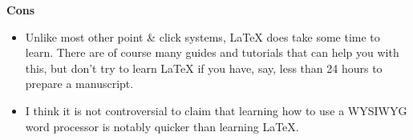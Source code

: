 \documentclass[a4paper,12pt]{article}
\begin{document}
\begin{enumerate}
  \textbf{Cons}
  \begin{itemize}
  \item  Unlike most other point \& click systems, LaTeX does take some time to learn. There are of course many guides and tutorials that can help you with this, but don't try to learn LaTeX if you have, say, less than 24 hours to prepare a manuscript.
  \item I think it is not controversial to claim that learning how to use a WYSIWYG word processor is notably quicker than learning LaTeX.
  \end{itemize}
\end{enumerate}
\end{document}
